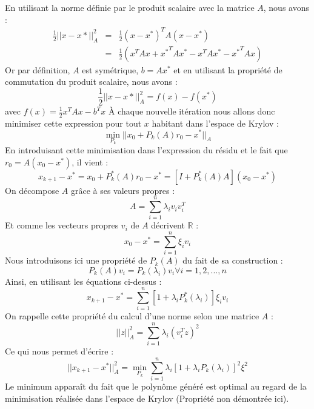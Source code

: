 En utilisant la norme définie par le produit scalaire avec la matrice $A$, nous avons : 
\begin{eqnarray}
\frac{1}{2} ||x - x*||^2_A &=& \frac{1}{2}(x - x^*)^TA(x - x^*)\\
&=& \frac{1}{2} (x^TAx + {x^*}^TAx^* - x^TAx^* - {x^*}^TAx)
\end{eqnarray}
Or par définition, $A$ est symétrique, $b = Ax^*$ et en utilisant la propriété de commutation du produit scalaire, nous avons : 
\begin{equation}
\frac{1}{2} ||x - x*||^2_A = f(x) - f(x^*)
\end{equation}
avec $f(x) = \frac{1}{2}x^TAx - b^Tx$
À chaque nouvelle itération nous allons donc minimiser cette expression pour tout $x$ habitant dans l'espace de Krylov : 
\begin{equation}
\min_{P_k} ||x_0 + P_k(A)r_0 - x^*||_A
\end{equation}
En introduisant cette minimisation dans l'expression du résidu et le fait que $r_0 = A(x_0 - x^*)$, il vient : 
\begin{equation}
x_{k+1} - x^* = x_0 + P_k^*(A)r_0 - x^* = [I + P_k^*(A)A](x_0 - x^*)
\end{equation}
On décompose $A$ grâce à ses valeurs propres : 
\begin{equation}
A = \sum_{i = 1}^{n} \lambda_i v_i v_i^T
\end{equation}
Et comme les vecteurs propres $v_i$ de $A$ décrivent $\mathbb{R}$ : 
\begin{equation}
x_0 - x^* = \sum^n_{i = 1} \xi_iv_i
\end{equation}
Nous introduisons ici une propriété de $P_k(A)$ du fait de sa construction : 
\begin{equation}
P_k(A)v_i = P_k(\lambda_i)v_i \forall i = 1, 2, ..., n
\end{equation}
Ainsi, en utilisant les équations ci-dessus : 
\begin{equation}
x_{k+1} - x^* = \sum_{i = 1}^{n} [1 + \lambda_i P_k^*(\lambda_i)]\xi_iv_i
\end{equation}
On rappelle cette propriété du calcul d'une norme selon une matrice $A$ : 
$$||z||^2_A = \sum_{i=1}^{n}\lambda_i(v_i^Tz)^2$$
Ce qui nous permet d'écrire : 
\begin{equation}
||x_{k+1} - x^*||^2_A = \underset{P_k}{\min} \sum_{i = 1}^{n} \lambda_i[1 + \lambda_iP_k(\lambda_i)]^2\xi^2
\end{equation}
Le minimum apparaît du fait que le polynôme généré est optimal au regard de la minimisation réalisée dans l'espace de Krylov (Propriété non démontrée ici).

